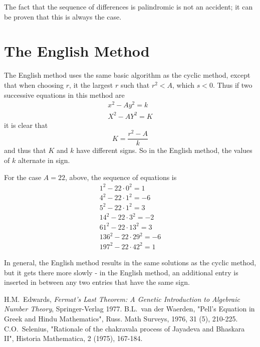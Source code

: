 \documentclass[12pt]{article}
\begin{document}
The fact that the sequence of differences is palindromic is not an accident; it can be proven that this is always the case.

\section*{The English Method}
The English method uses the same basic algorithm as the cyclic method, except that when choosing $r$, it  the largest $r$ such that $r^2<A$, which  $s<0$. Thus if two successive equations in this method are
\begin{gather*}
x^2-Ay^2=k\\
X^2-AY^2=K
\end{gather*}
it is clear that
\[K=\frac{r^2-A}{k}\]
and thus that $K$ and $k$ have different signs. So in the English method, the values of $k$ alternate in sign.

For the case $A=22$, above, the sequence of equations is
\begin{gather*}
1^2-22\cdot 0^2= 1\\
4^2-22\cdot 1^2=-6\\
5^2-22\cdot 1^2=3 \\
14^2-22\cdot 3^2=-2\\
61^2-22\cdot 13^2=3\\
136^2-22\cdot 29^2=-6\\
197^2-22\cdot 42^2=1
\end{gather*}

In general, the English method results in the same solutions as the cyclic method, but it gets there more slowly - in the English method, an additional entry is inserted in between any two entries that have the same sign.

\begin{thebibliography}{10}
H.M.~Edwards, \emph{Fermat's Last Theorem: A Genetic Introduction to Algebraic Number Theory}, Springer-Verlag 1977.
B.L.~van der Waerden, "Pell's Equation in Greek and Hindu Mathematics", Russ. Math Surveys, 1976, 31 (5), 210-225.
C.O.~Selenius, "Rationale of the chakravala process of Jayadeva and Bhaskara II", Historia Mathematica, 2 (1975), 167-184. 
\end{thebibliography}
\end{document}
